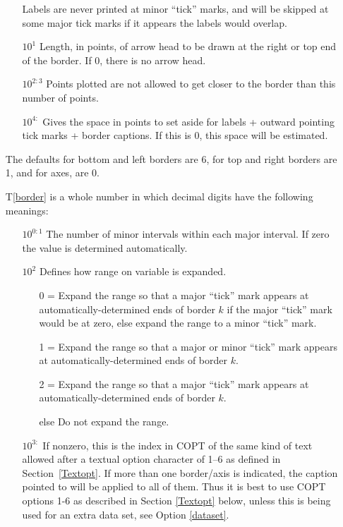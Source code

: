 \documentclass[twoside]{MATH77}
\begin{document}
\begin{multicols}{2}
\begin{enumerate}
\begin{itemize}
    Labels are never printed at minor ``tick'' marks, and will be skipped
    at some major tick marks if it appears the labels would overlap.

  \item[$10^1$] Length, in points, of arrow head to be drawn at the right
          or top end of the border.  If 0, there is no arrow head.
  \item[$10^{2:3}$] Points plotted are not allowed to get closer to the
          border than this number of points.
  \item[$10^{4:}$] Gives the space in points to set aside for labels +
          outward pointing tick marks + border captions.  If this is 0,
          this space will be estimated.
  \end{itemize}
   The defaults for bottom and left borders are 6, for top and right
   borders are 1, and for axes, are 0.

        T\ref{border} is a whole number in which decimal digits have the
        following meanings:
  \begin{itemize}
  \item[$10^{0:1}$] The number of minor intervals within each major
          interval. If zero the value is determined automatically.
  \item[$10^2$] Defines how range on variable is expanded.
    \begin{itemize}
    \item[0 =] Expand the range so that a major ``tick'' mark appears at
            automatically-determined ends of border $k$ if the major
            ``tick'' mark would be at zero, else expand the range to a
            minor ``tick'' mark.
    \item[1 =] Expand the range so that a major or minor ``tick''
            mark appears at automatically-determined ends of border $k$.
    \item[2 =] Expand the range so that a major ``tick'' mark appears at
            automatically-determined ends of border $k$.
    \item[else] Do not expand the range.
    \end{itemize}
  \item[$10^{3:}$] If nonzero, this is the index in COPT of the same kind
        of text allowed after a textual option character of 1--6 as
        defined in Section~\ref{Textopt}.  If more than one border/axis is
        indicated, the caption pointed to will be applied to all of them.
        Thus it is best to use COPT options 1-6 as described in Section
        \ref{Textopt} below, unless this is being used for an extra data
        set, see Option \ref{dataset}.
    \end{itemize}


\end{enumerate}
\end{multicols}
\end{document}
